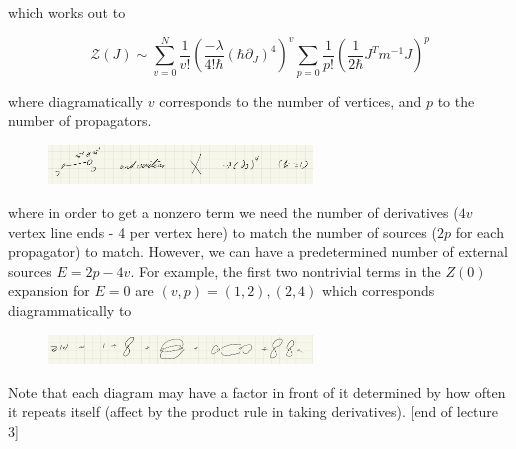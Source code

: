 \documentclass{article}
\theoremstyle{definition}
\begin{document}
which works out to

\begin{equation}
  \mathcal{Z}(J) \sim \sum_{v=0}^N \frac{1}{v!} \left( \frac{-\lambda}{4! \hbar}
    (\hbar \partial_J)^4 \right)^v \sum_{p = 0} \frac{1}{p!} \left( \frac{1}{2\hbar}
    J^T m^{-1} J \right)^p
\end{equation}

where diagramatically $v$ corresponds to the number of vertices, and $p$ to the
number of propagators.

\begin{figure}[H]
  \centering
  \includegraphics[width=7cm]{res/AQFT/diagram_interpretation}
  \label{diagram_interpretation}
\end{figure}
 
where in order to get a nonzero term we need the number of derivatives ($4v$
vertex line ends - 4 per vertex here) to match the number of sources ($2p$ for
each propagator) to match. However, we can have a predetermined number of
external sources $E = 2p - 4v$. For example, the first two nontrivial terms in
the $Z(0)$ expansion for $E = 0$ are $(v, p) = (1, 2), (2, 4)$ which corresponds
diagrammatically to

\begin{figure}[H]
  \centering
  \includegraphics[width=7cm]{res/AQFT/quartic_series_diagram}
  \label{quartic_series_diagram}
\end{figure}

Note that each diagram may have a factor in front of it determined by how often
it repeats itself (affect by the product rule in taking derivatives). [end of
lecture 3]
\end{document}
